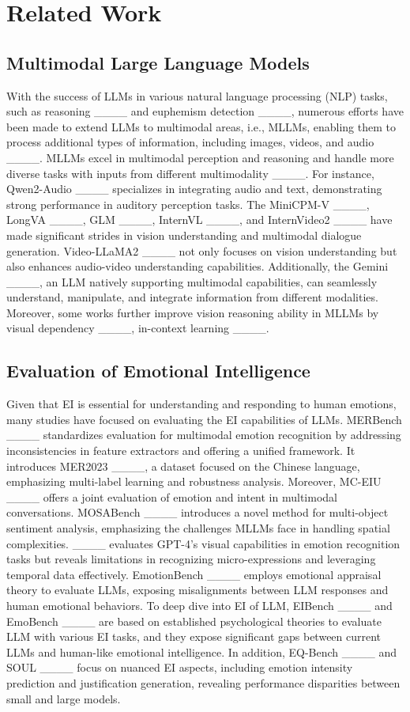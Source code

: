 \section{Related Work}
\label{app:related}
\subsection{Multimodal Large Language Models}
With the success of LLMs in various natural language processing (NLP) tasks, such as reasoning ____ and euphemism detection ____, numerous efforts have been made to extend LLMs to multimodal areas, i.e., MLLMs, enabling them to process additional types of information, including images, videos, and audio ____. MLLMs excel in multimodal perception and reasoning and handle more diverse tasks with inputs from different multimodality ____. 
For instance, Qwen2-Audio ____ specializes in integrating audio and text, demonstrating strong performance in auditory perception tasks. 
The MiniCPM-V ____, LongVA ____, GLM ____, InternVL ____, and InternVideo2 ____ have made significant strides in vision understanding and multimodal dialogue generation.
Video-LLaMA2 ____ not only focuses on vision understanding but also enhances audio-video understanding capabilities. Additionally, the Gemini ____, an LLM natively supporting multimodal capabilities, can seamlessly understand, manipulate, and integrate information from different modalities. 
Moreover, some works further improve vision reasoning ability in MLLMs by visual dependency ____, in-context learning ____.


\subsection{Evaluation of Emotional Intelligence}
Given that EI is essential for understanding and responding to human emotions, many studies have focused on evaluating the EI capabilities of LLMs. MERBench ____ standardizes evaluation for multimodal emotion recognition by addressing inconsistencies in feature extractors and offering a unified framework. It introduces MER2023 ____, a dataset focused on the Chinese language, emphasizing multi-label learning and robustness analysis.
Moreover, MC-EIU ____ offers a joint evaluation of emotion and intent in multimodal conversations.
MOSABench ____ introduces a novel method for multi-object sentiment analysis, emphasizing the challenges MLLMs face in handling spatial complexities.
____ evaluates GPT-4's visual capabilities in emotion recognition tasks but reveals limitations in recognizing micro-expressions and leveraging temporal data effectively. EmotionBench ____ employs emotional appraisal theory to evaluate LLMs, exposing misalignments between LLM responses and human emotional behaviors. To deep dive into EI of LLM,  EIBench ____ and EmoBench ____ are based on established psychological theories to evaluate LLM with various EI tasks, and they expose significant gaps between current LLMs and human-like emotional intelligence. In addition, EQ-Bench ____ and SOUL ____ focus on nuanced EI aspects, including emotion intensity prediction and justification generation, revealing performance disparities between small and large models. 



